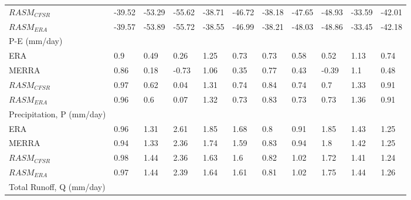 \begin{table}
{\begin{tabular}{lllllllllll}
$RASM_{CFSR}$                                       & -39.52                       & -53.29 & -55.62 & -38.71 & -46.72 & -38.18 & -47.65 & -48.93 & -33.59 & -42.01 \\
$RASM_{ERA}$                                        & -39.57                       & -53.89 & -55.72 & -38.55 & -46.99 & -38.21 & -48.03 & -48.86 & -33.45 & -42.18 \\
P-E (mm/day)                                   &                              &        &        &        &        &        &        &        &        &        \\
ERA                                            & 0.9                          & 0.49   & 0.26   & 1.25   & 0.73   & 0.73   & 0.58   & 0.52   & 1.13   & 0.74   \\
MERRA                                          & 0.86                         & 0.18   & -0.73  & 1.06   & 0.35   & 0.77   & 0.43   & -0.39  & 1.1    & 0.48   \\
$RASM_{CFSR}$                                       & 0.97                         & 0.62   & 0.04   & 1.31   & 0.74   & 0.84   & 0.74   & 0.7    & 1.33   & 0.91   \\
$RASM_{ERA}$                                        & 0.96                         & 0.6    & 0.07   & 1.32   & 0.73   & 0.83   & 0.73   & 0.73   & 1.36   & 0.91   \\
Precipitation, P (mm/day)                      &                              &        &        &        &        &        &        &        &        &        \\
ERA                                            & 0.96                         & 1.31   & 2.61   & 1.85   & 1.68   & 0.8    & 0.91   & 1.85   & 1.43   & 1.25   \\
MERRA                                          & 0.94                         & 1.33   & 2.36   & 1.74   & 1.59   & 0.83   & 0.94   & 1.8    & 1.42   & 1.25   \\
$RASM_{CFSR}$                                       & 0.98                         & 1.44   & 2.36   & 1.63   & 1.6    & 0.82   & 1.02   & 1.72   & 1.41   & 1.24   \\
$RASM_{ERA}$                                        & 0.97                         & 1.44   & 2.39   & 1.64   & 1.61   & 0.81   & 1.02   & 1.75   & 1.44   & 1.26   \\
Total Runoff, Q (mm/day)                       &                              &        &        &        &        &        &        &        &        &        \\

\end{tabular}}
\end{table}

